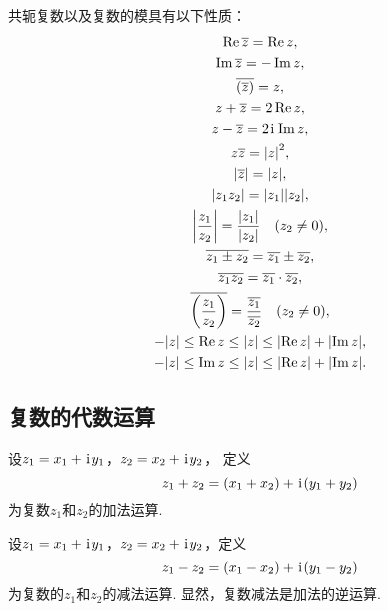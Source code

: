 \begin{property}
共轭复数以及复数的模具有以下性质：
\begin{gather*}
	\Re \overline{z} = \Re z, \\
	\Im \overline{z} = -\Im z, \\
	\overline{(\overline{z})} = z, \\
	z+\overline{z} = 2 \Re z, \\
	z-\overline{z} = 2\kern1pt\mathrm{i}\kern1pt \Im z, \\
	z\overline{z} = \abs{z}^2, \\
	\abs{\overline{z}}=\abs{z}, \\
	\abs{z_1 z_2} = \abs{z_1} \abs{z_2}, \\
	\abs{\frac{z_1}{z_2}} = \frac{\abs{z_1}}{\abs{z_2}} \quad(z_2 \neq 0), \\
	\overline{z_1 \pm z_2} = \overline{z_1} \pm \overline{z_2}, \\
	\overline{z_1 z_2} = \overline{z_1} \cdot \overline{z_2}, \\
	\overline{\left(\frac{z_1}{z_2}\right)} = \frac{\overline{z_1}}{\overline{z_2}} \quad (z_2 \neq 0), \\
	-\abs{z} \leq \Re z \leq \abs{z} \leq \abs{\Re z} + \abs{\Im z}, \\
	-\abs{z} \leq \Im z \leq \abs{z} \leq \abs{\Re z} + \abs{\Im z}.
\end{gather*}
\end{property}

\subsection{复数的代数运算}
\begin{definition}[复数加法]
设\(z_1=x_1+\kern1pt\mathrm{i}\kern1pt y_1\)，\(z_2=x_2+\kern1pt\mathrm{i}\kern1pt y_2\)，
定义\begin{equation*}
z_1+z_2=(x_1+x_2)+\kern1pt\mathrm{i}\kern1pt(y_1+y_2)
\end{equation*}为复数\(z_1\)和\(z_2\)的加法运算.
\end{definition}

\begin{definition}[复数减法]
设\(z_1=x_1+\kern1pt\mathrm{i}\kern1pt y_1\)，\(z_2=x_2+\kern1pt\mathrm{i}\kern1pt y_2\)，定义\begin{equation*}
z_1-z_2=(x_1-x_2)+\kern1pt\mathrm{i}\kern1pt(y_1-y_2)
\end{equation*}为复数的\(z_1\)和\(z_2\)的减法运算.
显然，复数减法是加法的逆运算.
\end{definition}

